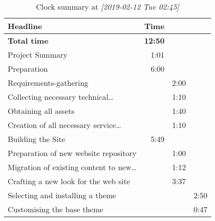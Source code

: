 \documentclass{article}
\begin{document}
\begin{table}[htbp]
\caption{Clock summary at \textit{[2019-02-12 Tue 02:45]}}
\centering
\begin{tabular}{lrrl}
Headline & Time &  & \\
\hline
\textbf{Total time} & \textbf{12:50} &  & \\
\hline
Project Summary & 1:01 &  & \\
Preparation & 6:00 &  & \\
\hspace*{1.0em}Requirements-gathering &  & 2:00 & \\
\hspace*{1.0em}Collecting necessary technical\ldots{} &  & 1:10 & \\
\hspace*{1.0em}Obtaining all assets &  & 1:40 & \\
\hspace*{1.0em}Creation of all necessary service\ldots{} &  & 1:10 & \\
Building the Site & 5:49 &  & \\
\hspace*{1.0em}Preparation of new website repository &  & 1:00 & \\
\hspace*{1.0em}Migration of existing content to new\ldots{} &  & 1:12 & \\
\hspace*{1.0em}Crafting a new look for the web site &  & 3:37 & \\
\hspace*{2.0em}Selecting and installing a theme &  &  & 2:50\\
\hspace*{2.0em}Customising the base theme &  &  & 0:47\\
\end{tabular}
\end{table}
\end{document}
